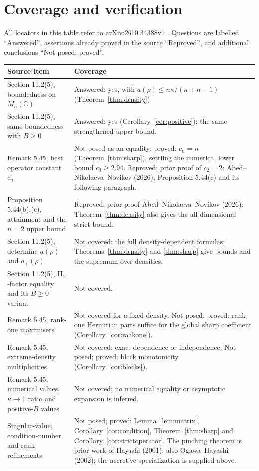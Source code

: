 \documentclass[11pt]{article}
\newcommand{\C}{\mathbb C}
\begin{document}
\section{Coverage and verification}

All locators in this table refer to arXiv:2610.34388v1 \cite{ANN}.
Questions are labelled ``Answered'', assertions already proved in the
source ``Reproved'', and additional conclusions ``Not posed; proved''.
\begin{center}
\small
\begin{tabularx}{\textwidth}{@{}>{\raggedright\arraybackslash}p{}>{\raggedright\arraybackslash}X@{}}
\toprule
Source item & Coverage\\
\midrule
Section 11.2(5), boundedness on $M_n(\C)$ &
Answered: yes, with $a(\rho)\leq n\kappa/(\kappa+n-1)$
(Theorem~\ref{thm:density}).\\
Section 11.2(5), same boundedness with $B\geq0$ &
Answered: yes (Corollary~\ref{cor:positive}); the same strengthened upper bound.\\
Remark 5.45, best operator constant $c_n$ &
Not posed as an equality; proved: $c_n=n$
(Theorem~\ref{thm:sharp}), settling the numerical lower bound $c_3\geq2.94$.
Reproved; prior proof of $c_2=2$: Abed--Nikolaeva--Novikov (2026),
Proposition 5.44(c) and its following paragraph.\\
Proposition 5.44(b),(c), attainment and the $n=2$ upper bound &
Reproved; prior proof Abed--Nikolaeva--Novikov (2026).
Theorem~\ref{thm:density} also gives the all-dimensional strict bound.\\
Section 11.2(5), determine $a(\rho)$ and $a_+(\rho)$ &
Not covered: the full density-dependent formulas; Theorems~\ref{thm:density}
and \ref{thm:sharp} give bounds and the supremum over densities.\\
Section 11.2(5), II$_1$-factor equality and its $B\geq0$ variant &
Not covered.\\
Remark 5.45, rank-one maximisers &
Not covered for a fixed density. Not posed; proved: rank-one Hermitian
parts suffice for the global sharp coefficient (Corollary~\ref{cor:rankone}).\\
Remark 5.45, extreme-density multiplicities &
Not covered: exact dependence or independence. Not posed; proved:
block monotonicity (Corollary~\ref{cor:blocks}).\\
Remark 5.45, numerical values, $\kappa\to1$ ratio and positive-$B$ values &
Not covered; no numerical equality or asymptotic expansion is inferred.\\
Singular-value, condition-number and rank refinements &
Not posed; proved: Lemma~\ref{lem:matrix}, Corollary~\ref{cor:condition},
Theorem~\ref{thm:sharp} and Corollary~\ref{cor:strictoperator}.
The pinching theorem is prior work of Hayashi (2001), also
Ogawa--Hayashi (2002); the accretive specialization is supplied above.\\
\bottomrule
\end{tabularx}
\end{center}
\end{document}
